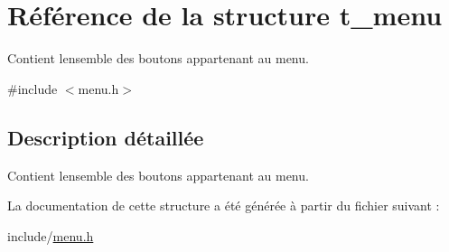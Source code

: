 \hypertarget{structt__menu}{}\section{Référence de la structure t\+\_\+menu}
\label{structt__menu}


Contient l\textquotesingle{}ensemble des boutons appartenant au menu.  




{\ttfamily \#include $<$menu.\+h$>$}



\subsection{Description détaillée}
Contient l\textquotesingle{}ensemble des boutons appartenant au menu. 

La documentation de cette structure a été générée à partir du fichier suivant \+:\begin{DoxyCompactItemize}
\item 
include/\hyperlink{menu_8h}{menu.\+h}\end{DoxyCompactItemize}
